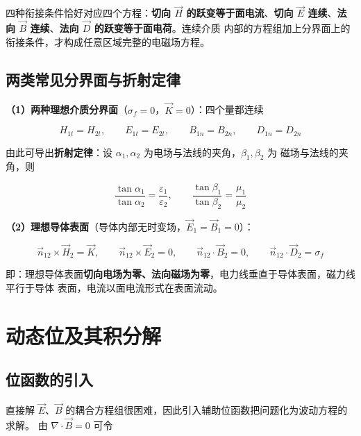 四种衔接条件恰好对应四个方程：\textbf{切向 $\vec{H}$ 的跃变等于面电流}、\textbf{切向 $\vec{E}$
连续}、\textbf{法向 $\vec{B}$ 连续}、\textbf{法向 $\vec{D}$ 的跃变等于面电荷}。连续介质
内部的方程组加上分界面上的衔接条件，才构成任意区域完整的电磁场方程。

\subsection{两类常见分界面与折射定律}

\textbf{（1）两种理想介质分界面}（$\sigma_f=0$，$\vec{K}=0$）：四个量都连续
\begin{formulaBox}
\[
H_{1t}=H_{2t},\qquad E_{1t}=E_{2t},\qquad B_{1n}=B_{2n},\qquad D_{1n}=D_{2n}
\]
\end{formulaBox}
由此可导出\textbf{折射定律}：设 $\alpha_1,\alpha_2$ 为电场与法线的夹角，$\beta_1,\beta_2$ 为
磁场与法线的夹角，则
\begin{formulaBox}
\[
\frac{\tan\alpha_1}{\tan\alpha_2}=\frac{\varepsilon_1}{\varepsilon_2},
\qquad
\frac{\tan\beta_1}{\tan\beta_2}=\frac{\mu_1}{\mu_2}
\]
\end{formulaBox}

\textbf{（2）理想导体表面}（导体内部无时变场，$\vec{E}_1=\vec{B}_1=0$）：
\begin{formulaBox}
\[
\vec{n}_{12}\times\vec{H}_2=\vec{K},\qquad
\vec{n}_{12}\times\vec{E}_2=0,\qquad
\vec{n}_{12}\cdot\vec{B}_2=0,\qquad
\vec{n}_{12}\cdot\vec{D}_2=\sigma_f
\]
\end{formulaBox}
即：理想导体表面\textbf{切向电场为零、法向磁场为零}，电力线垂直于导体表面，磁力线平行于导体
表面，电流以面电流形式在表面流动。


\section{动态位及其积分解}

\subsection{位函数的引入}

直接解 $\vec{E}$、$\vec{B}$ 的耦合方程组很困难，因此引入辅助位函数把问题化为波动方程的求解。
由 $\nabla\cdot\vec{B}=0$ 可令

